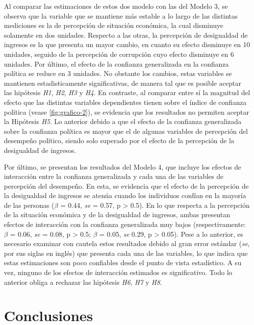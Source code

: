 \documentclass[12pt,twoside]{templates/facsothesis}
\begin{document}
Al comparar las estimaciones de estos dos modelo con las del Modelo 3, se observa que la variable que se mantiene más estable a lo largo de las distintas mediciones es la de percepción de situación económica, la cual disminuye solamente en dos unidades. Respecto a las otras, la percepción de desigualdad de ingresos es la que presenta un mayor cambio, en cuanto su efecto disminuye en 10 unidades, seguido de la percepción de corrupción cuyo efecto disminuye en 6 unidades. Por último, el efecto de la confianza generalizada en la confianza política se reduce en 3 unidades. No obstante los cambios, estas variables se mantienen estadisticamente significativas, de manera tal que es posible aceptar las hipótesis \emph{H1}, \emph{H2}, \emph{H3} y \emph{H4}. En contraste, al comparar entre sí la magnitud del efecto que las distintas variables dependientes tienen sobre el índice de confianza política (vease \ref{fig:grafico-2}), se evidencia que los resultados no permiten aceptar la Hipótesis \emph{H5}. Lo anterior debido a que el efecto de la confianza generalizada sobre la confianza política es mayor que el de algunas variables de percepción del desempeño político, siendo solo superado por el efecto de la percepción de la desigualdad de ingresos.

Por último, se presentan los resultados del Modelo 4, que incluye los efectos de interacción entre la confianza generalizada y cada una de las variables de percepción del desempeño. En esta, se evidencia que el efecto de la percepción de la desigualdad de ingresos se atenúa cuando los individuos confían en la mayoría de las personas (\(\beta\) = 0.44, \emph{se} = 0.57, p \textgreater{} 0.5). En lo que respecta a la percepción de la situación económica y de la desigualdad de ingresos, ambas presentan efectos de interacción con la confianza generalizada muy bajos (respectivamente: \(\beta\) = 0.06, \emph{se} = 0.08, p \textgreater{} 0.5; \(\beta\) = 0.05, \emph{se} 0.29, p \textgreater{} 0.05). Pese a lo anterior, es necesario examinar con cautela estos resultados debido al gran error estándar (\emph{se}, por sus siglas en inglés) que presenta cada una de las variables, lo que indica que estas estimaciones son poco confiables desde el punto de vista estadístico. A su vez, ninguno de los efectos de interacción estimados es significativo. Todo lo anterior obliga a rechazar las hipótesis \emph{H6}, \emph{H7} y \emph{H8}.

\chapter{Conclusiones}\label{conclusiones}
\end{document}
